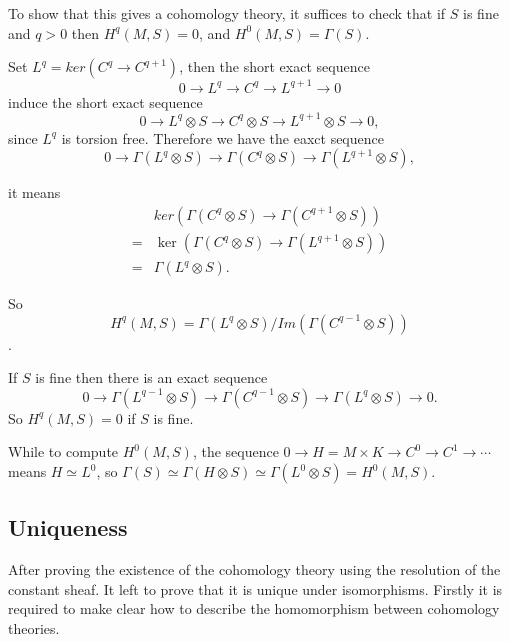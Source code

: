 \documentclass[twoside]{article}
\begin{document}
To show that this gives a cohomology theory, it suffices to check that if $S$ is fine and $q>0$ then $H^q(M,S)=0$, and $H^0(M,S)=\Gamma(S)$.

Set $L^q=ker(C^q\to C^{q+1})$, then the short exact sequence $$
0\to L^q\to C^q\to L^{q+1}\to 0
$$
induce the short  exact sequence $$
0\to L^q\otimes S\to C^q\otimes S\to L^{q+1}\otimes S\to 0,
$$
since $L^q$ is torsion free.
Therefore we have the eaxct sequence
$$
0\to \Gamma(L^q\otimes S)\to \Gamma(C^q\otimes S)\to \Gamma(L^{q+1}\otimes S),
$$

it means $$\begin{aligned}
&ker(\Gamma(C^q\otimes S)\to \Gamma(C^{q+1}\otimes S))\\
=&\ker(\Gamma(C^q\otimes S)\to \Gamma(L^{q+1}\otimes S))\\
=&\Gamma(L^q\otimes S).
\end{aligned}$$

So $$H^q(M,S)=\Gamma(L^q\otimes S)/Im(\Gamma(C^{q-1}\otimes S))$$.

If $S$ is fine then  there is an exact sequence $$
0\to \Gamma(L^{q-1}\otimes S)\to \Gamma(C^{q-1}\otimes S)\to \Gamma(L^q\otimes S)\to 0.
$$
So $H^q(M,S)=0$ if $S$ is fine.

While to compute $H^0(M,S)$, the sequence $0\to H=M\times K\to C^0\to C^1\to\cdots$ means $H\simeq L^0$, so $\Gamma(S)\simeq \Gamma(H\otimes S)\simeq \Gamma(L^0\otimes S)=H^0(M,S)$.


\subsection{Uniqueness}

After proving the existence of the cohomology theory using the resolution of the constant sheaf. It left to prove that it is unique under isomorphisms. Firstly it is required to  make  clear how to describe the homomorphism between cohomology theories.
\end{document}
